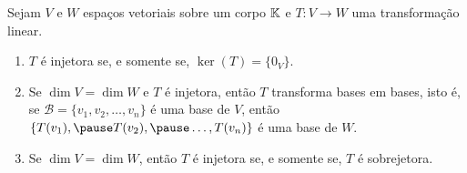 \documentclass{beamer}
\begin{document}
    \begin{frame}
        \begin{proposicao}
            Sejam $V$ e $W$ espaços vetoriais sobre um corpo $\mathbb{K}$ \pause e $T \colon V \to W$ uma transformação linear.\pause
            \begin{enumerate}[label={\roman*})]
                \vspace*{.25cm}
                \item $T$ é injetora \pause se, e somente se, $\ker(T) = \{0_V\}$.\pause

                \vspace{.75cm}

                \item Se $\dim V = \dim W$  e $T$ é injetora, \pause então $T$ transforma bases em bases, \pause isto é, se
                    $\mathcal{B} = \{v_1, v_2, \dots, v_n\}$ é uma base de $V$, \pause então $\{T(v_1), \pause T(v_2), \pause \dots,
                    T(v_n)\}$ é uma base de $W$.\pause

                \vspace{.75cm}

                \item Se $\dim V = \dim W$, \pause então $T$ é injetora \pause se, e somente se, \pause $T$ é sobrejetora.
            \end{enumerate}
        \end{proposicao}
    \end{frame}

%
%
\end{document}
